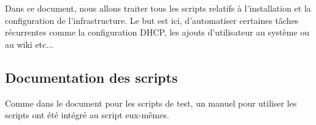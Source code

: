 \documentclass[../livrable-4.tex]{subfiles}
\begin{document}
Dans ce document, nous allons traiter tous les scripts relatifs à l'installation et 
la configuration de l'infrastructure. Le but est ici, d'automatiser certaines tâches récurrentes
comme la configuration DHCP, les ajouts d'utilisateur au système ou au wiki etc... 

\subsection{Documentation des scripts}
Comme dans le document pour les scripts de test, un manuel pour utiliser les scripts
ont été intégré au script eux-mêmes.

\UseRawInputEncoding

\end{document}
